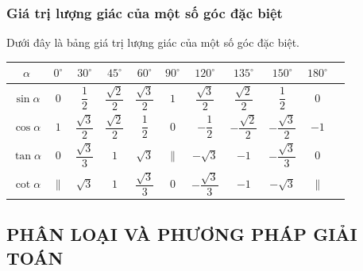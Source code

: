 \subsubsection{Giá trị lượng giác của một số góc đặc biệt}
Dưới đây là bảng giá trị lượng giác của một số góc đặc biệt.
\begin{center}
	\renewcommand{\arraystretch}{2.1}%
	\begin{tabular}{|c|c|c|c|c|c|c|c|c|c|c|}
		\hline
		$\alpha$     & $0^\circ$   & $30^\circ$            & $45^\circ$            & $60^\circ$            & $90^\circ$  & $120^\circ$            & $135^\circ$            & $150^\circ$            & $180^\circ$ \\
		\hline
		$\sin\alpha$ & $0$         & $\dfrac{1}{2}$        & $\dfrac{\sqrt{2}}{2}$ & $\dfrac{\sqrt{3}}{2}$ & $1$         & $\dfrac{\sqrt{3}}{2}$  & $\dfrac{\sqrt{2}}{2}$  & $\dfrac{1}{2}$         & $0$         \\
		\hline
		$\cos\alpha$ & $1$         & $\dfrac{\sqrt{3}}{2}$ & $\dfrac{\sqrt{2}}{2}$ & $\dfrac{1}{2}$        & $0$         & $-\dfrac{1}{2}$        & $-\dfrac{\sqrt{2}}{2}$ & $-\dfrac{\sqrt{3}}{2}$ & $-1$        \\
		\hline
		$\tan\alpha$ & $0$         & $\dfrac{\sqrt{3}}{3}$ & $1$                   & $\sqrt{3}$            & $\parallel$ & $-\sqrt{3}$            & $-1$                   & $-\dfrac{\sqrt{3}}{3}$ & $0$         \\
		\hline
		$\cot\alpha$ & $\parallel$ & $\sqrt{3}$            & $1$                   & $\dfrac{\sqrt{3}}{3}$ & $0$         & $-\dfrac{\sqrt{3}}{3}$ & $-1$                   & $-\sqrt{3}$            & $\parallel$ \\
		\hline
	\end{tabular}
\end{center}
\subsection{PHÂN LOẠI VÀ PHƯƠNG PHÁP GIẢI TOÁN}


